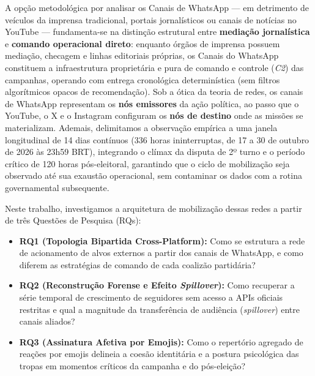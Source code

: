 \documentclass[12pt]{article}
\begin{document}
A opção metodológica por analisar os Canais de WhatsApp --- em detrimento de veículos da imprensa tradicional, portais jornalísticos ou canais de notícias no YouTube --- fundamenta-se na distinção estrutural entre \textbf{mediação jornalística} e \textbf{comando operacional direto}: enquanto órgãos de imprensa possuem mediação, checagem e linhas editoriais próprias, os Canais do WhatsApp constituem a infraestrutura proprietária e pura de comando e controle (\textit{C2}) das campanhas, operando com entrega cronológica determinística (sem filtros algorítmicos opacos de recomendação). Sob a ótica da teoria de redes, os canais de WhatsApp representam os \textbf{nós emissores} da ação política, ao passo que o YouTube, o X e o Instagram configuram os \textbf{nós de destino} onde as missões se materializam. Ademais, delimitamos a observação empírica a uma janela longitudinal de 14 dias contínuos (336 horas ininterruptas, de 17 a 30 de outubro de 2026 às 23h59 BRT), integrando o clímax da disputa de 2º turno e o período crítico de 120 horas pós-eleitoral, garantindo que o ciclo de mobilização seja observado até sua exaustão operacional, sem contaminar os dados com a rotina governamental subsequente.

Neste trabalho, investigamos a arquitetura de mobilização dessas redes a partir de três Questões de Pesquisa (RQs):
\begin{itemize}
    \item \textbf{RQ1 (Topologia Bipartida Cross-Platform):} Como se estrutura a rede de acionamento de alvos externos a partir dos canais de WhatsApp, e como diferem as estratégias de comando de cada coalizão partidária?
    \item \textbf{RQ2 (Reconstrução Forense e Efeito \textit{Spillover}):} Como recuperar a série temporal de crescimento de seguidores sem acesso a APIs oficiais restritas e qual a magnitude da transferência de audiência (\textit{spillover}) entre canais aliados?
    \item \textbf{RQ3 (Assinatura Afetiva por Emojis):} Como o repertório agregado de reações por emojis delineia a coesão identitária e a postura psicológica das tropas em momentos críticos da campanha e do pós-eleição?
\end{itemize}
\end{document}
